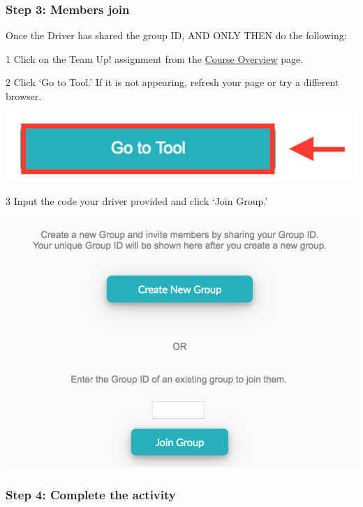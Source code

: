 \documentclass[
  openany]{book}
\begin{document}
\hypertarget{step-3-members-join}{%
\subsubsection{Step 3: Members join}\label{step-3-members-join}}

Once the Driver has shared the group ID, AND ONLY THEN do the following:

1 Click on the Team Up! assignment from the \href{https://q.utoronto.ca/courses/253305/pages/course-overview}{Course Overview} page.

2 Click `Go to Tool.' If it is not appearing, refresh your page or try a different browser.

\begin{center}\includegraphics[width=0.5\linewidth]{images/course-tools/gototool} \end{center}

3 Input the code your driver provided and click `Join Group.'

\begin{center}\includegraphics[width=0.45\linewidth]{images/course-tools/choose create} \end{center}

\hypertarget{step-4-complete-the-activity}{%
\subsubsection{Step 4: Complete the activity}\label{step-4-complete-the-activity}}
\end{document}
